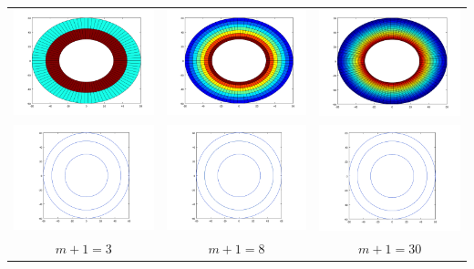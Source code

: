     {\centering \begin{tabular}{ccc}
      \includegraphics[width=4.5cm]{graficos/1/1b-3.png} &
      \includegraphics[width=4.5cm]{graficos/1/1b-8.png} &
      \includegraphics[width=4.5cm]{graficos/1/1b-30.png} \\
      \includegraphics[width=4.5cm]{graficos/1/1b-3-iso.png} &
      \includegraphics[width=4.5cm]{graficos/1/1b-8-iso.png} &
      \includegraphics[width=4.5cm]{graficos/1/1b-30-iso.png} \\
      {\small $m+1 = 3$} &
      {\small $m+1 = 8$} &
      {\small $m+1 = 30$} \\
    \end{tabular}}


